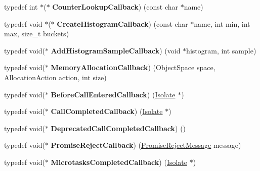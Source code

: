 \begin{DoxyCompactItemize}
\item 
typedef int $\ast$($\ast$ {\bfseries Counter\+Lookup\+Callback}) (const char $\ast$name)\hypertarget{namespacev8_a5efca05a9f1f278a4eec832ce419104f}{}\label{namespacev8_a5efca05a9f1f278a4eec832ce419104f}

\item 
typedef void $\ast$($\ast$ {\bfseries Create\+Histogram\+Callback}) (const char $\ast$name, int min, int max, size\+\_\+t buckets)\hypertarget{namespacev8_aafbf15734701792a14c02dbca7535b75}{}\label{namespacev8_aafbf15734701792a14c02dbca7535b75}

\item 
typedef void($\ast$ {\bfseries Add\+Histogram\+Sample\+Callback}) (void $\ast$histogram, int sample)\hypertarget{namespacev8_a5a7c6bb8050ad84f0a453056ec325d1c}{}\label{namespacev8_a5a7c6bb8050ad84f0a453056ec325d1c}

\item 
typedef void($\ast$ {\bfseries Memory\+Allocation\+Callback}) (Object\+Space space, Allocation\+Action action, int size)\hypertarget{namespacev8_a2402a6535cafc5f721192b300502fb0a}{}\label{namespacev8_a2402a6535cafc5f721192b300502fb0a}

\item 
typedef void($\ast$ {\bfseries Before\+Call\+Entered\+Callback}) (\hyperlink{classv8_1_1Isolate}{Isolate} $\ast$)\hypertarget{namespacev8_abe10f58d37b0736a292a6c7f180fb40c}{}\label{namespacev8_abe10f58d37b0736a292a6c7f180fb40c}

\item 
typedef void($\ast$ {\bfseries Call\+Completed\+Callback}) (\hyperlink{classv8_1_1Isolate}{Isolate} $\ast$)\hypertarget{namespacev8_a5003dc8cb6a81f522a9c6b05b98d9e34}{}\label{namespacev8_a5003dc8cb6a81f522a9c6b05b98d9e34}

\item 
typedef void($\ast$ {\bfseries Deprecated\+Call\+Completed\+Callback}) ()\hypertarget{namespacev8_a878e6b3a304e7bcbc155a16fef8400f1}{}\label{namespacev8_a878e6b3a304e7bcbc155a16fef8400f1}

\item 
typedef void($\ast$ {\bfseries Promise\+Reject\+Callback}) (\hyperlink{classv8_1_1PromiseRejectMessage}{Promise\+Reject\+Message} message)\hypertarget{namespacev8_a3367f6ae375d6d4b4b3f992953c135ba}{}\label{namespacev8_a3367f6ae375d6d4b4b3f992953c135ba}

\item 
typedef void($\ast$ {\bfseries Microtasks\+Completed\+Callback}) (\hyperlink{classv8_1_1Isolate}{Isolate} $\ast$)\hypertarget{namespacev8_af193f756612950a896e140052cf17a42}{}\label{namespacev8_af193f756612950a896e140052cf17a42}


\end{DoxyCompactItemize}
